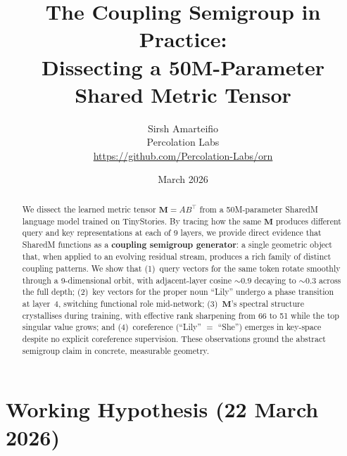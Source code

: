 \documentclass[11pt, a4paper]{article}
\title{%
    \textbf{The Coupling Semigroup in Practice:}\\[4pt]
    \Large Dissecting a 50M-Parameter Shared Metric Tensor%
}
\author{%
    Sirsh Amarteifio\\
    {\small Percolation Labs}\\
    {\small \url{https://github.com/Percolation-Labs/orn}}%
}
\date{March 2026 \quad{\small\textnormal{,  Working Document}}}
\newcommand{\M}{\mathbf{M}}
\theoremstyle{plain}
\theoremstyle{remark}
\begin{document}
\maketitle

\begin{abstract}
We dissect the learned metric tensor $\M = AB^\top$ from a 50M-parameter SharedM language model trained on TinyStories.
By tracing how the same $\M$ produces different query and key representations at each of 9 layers, we provide direct evidence that SharedM functions as a \textbf{coupling semigroup generator}: a single geometric object that, when applied to an evolving residual stream, produces a rich family of distinct coupling patterns.
We show that (1)~query vectors for the same token rotate smoothly through a 9-dimensional orbit, with adjacent-layer cosine ${\sim}0.9$ decaying to ${\sim}0.3$ across the full depth; (2)~key vectors for the proper noun ``Lily'' undergo a phase transition at layer~4, switching functional role mid-network; (3)~$\M$'s spectral structure crystallises during training, with effective rank sharpening from 66 to 51 while the top singular value grows; and (4)~coreference (``Lily'' $=$ ``She'') emerges in key-space despite no explicit coreference supervision.
These observations ground the abstract semigroup claim in concrete, measurable geometry.
\end{abstract}

\section*{Working Hypothesis (22 March 2026)}
\end{document}
